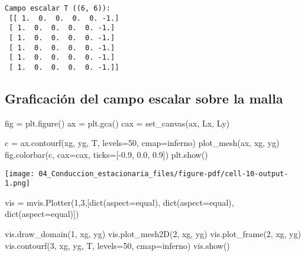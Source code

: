 \documentclass[
  letterpaper,
  DIV=11,
  numbers=noendperiod]{scrreprt}
\newenvironment{Shaded}{\begin{snugshade}}{\end{snugshade}}
\newcommand{\BuiltInTok}[1]{\textcolor[rgb]{0.00,0.23,0.31}{#1}}
\newcommand{\DecValTok}[1]{\textcolor[rgb]{0.68,0.00,0.00}{#1}}
\newcommand{\FloatTok}[1]{\textcolor[rgb]{0.68,0.00,0.00}{#1}}
\newcommand{\NormalTok}[1]{\textcolor[rgb]{0.00,0.23,0.31}{#1}}
\newcommand{\OperatorTok}[1]{\textcolor[rgb]{0.37,0.37,0.37}{#1}}
\newcommand{\StringTok}[1]{\textcolor[rgb]{0.13,0.47,0.30}{#1}}
\begin{document}
\begin{verbatim}
Campo escalar T ((6, 6)):
 [[ 1.  0.  0.  0.  0. -1.]
 [ 1.  0.  0.  0.  0. -1.]
 [ 1.  0.  0.  0.  0. -1.]
 [ 1.  0.  0.  0.  0. -1.]
 [ 1.  0.  0.  0.  0. -1.]
 [ 1.  0.  0.  0.  0. -1.]]
\end{verbatim}

\subsection{Graficación del campo escalar sobre la
malla}\label{graficaciuxf3n-del-campo-escalar-sobre-la-malla}

\begin{Shaded}
\begin{Highlighting}[]
\NormalTok{fig }\OperatorTok{=}\NormalTok{ plt.figure()}
\NormalTok{ax }\OperatorTok{=}\NormalTok{ plt.gca()}
\NormalTok{cax }\OperatorTok{=}\NormalTok{ set\_canvas(ax, Lx, Ly)}

\NormalTok{c }\OperatorTok{=}\NormalTok{ ax.contourf(xg, yg, T, levels}\OperatorTok{=}\DecValTok{50}\NormalTok{, cmap}\OperatorTok{=}\StringTok{\textquotesingle{}inferno\textquotesingle{}}\NormalTok{)}
\NormalTok{plot\_mesh(ax, xg, yg)}
\NormalTok{fig.colorbar(c, cax}\OperatorTok{=}\NormalTok{cax, ticks}\OperatorTok{=}\NormalTok{[}\OperatorTok{{-}}\FloatTok{0.9}\NormalTok{, }\FloatTok{0.0}\NormalTok{, }\FloatTok{0.9}\NormalTok{])}
\NormalTok{plt.show()}
\end{Highlighting}
\end{Shaded}

\texttt{[image: 04\_Conduccion\_estacionaria\_files/figure-pdf/cell-10-output-1.png]}

\begin{Shaded}
\begin{Highlighting}[]
\NormalTok{vis }\OperatorTok{=}\NormalTok{ mvis.Plotter(}\DecValTok{1}\NormalTok{,}\DecValTok{3}\NormalTok{,[}\BuiltInTok{dict}\NormalTok{(aspect}\OperatorTok{=}\StringTok{\textquotesingle{}equal\textquotesingle{}}\NormalTok{), }\BuiltInTok{dict}\NormalTok{(aspect}\OperatorTok{=}\StringTok{\textquotesingle{}equal\textquotesingle{}}\NormalTok{), }\BuiltInTok{dict}\NormalTok{(aspect}\OperatorTok{=}\StringTok{\textquotesingle{}equal\textquotesingle{}}\NormalTok{)])}

\NormalTok{vis.draw\_domain(}\DecValTok{1}\NormalTok{, xg, yg)}
\NormalTok{vis.plot\_mesh2D(}\DecValTok{2}\NormalTok{, xg, yg)}
\NormalTok{vis.plot\_frame(}\DecValTok{2}\NormalTok{, xg, yg)}
\NormalTok{vis.contourf(}\DecValTok{3}\NormalTok{, xg, yg, T, levels}\OperatorTok{=}\DecValTok{50}\NormalTok{, cmap}\OperatorTok{=}\StringTok{\textquotesingle{}inferno\textquotesingle{}}\NormalTok{)}
\NormalTok{vis.show()}
\end{Highlighting}
\end{Shaded}
\end{document}

